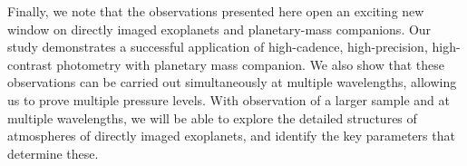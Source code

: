\documentclass[apj]{emulateapj}
\begin{document}
Finally, we note that the observations presented here open an exciting
new window on directly imaged exoplanets and planetary-mass
companions. Our study demonstrates a successful application of
high-cadence, high-precision, high-contrast photometry with planetary
mass companion. We also show that these observations can be carried
out simultaneously at multiple wavelengths, allowing us to prove
multiple pressure levels. With observation of a larger sample and at
multiple wavelengths, we will be able to explore the detailed
structures of atmospheres of directly imaged exoplanets, and identify
the key parameters that determine these.



\end{document}
